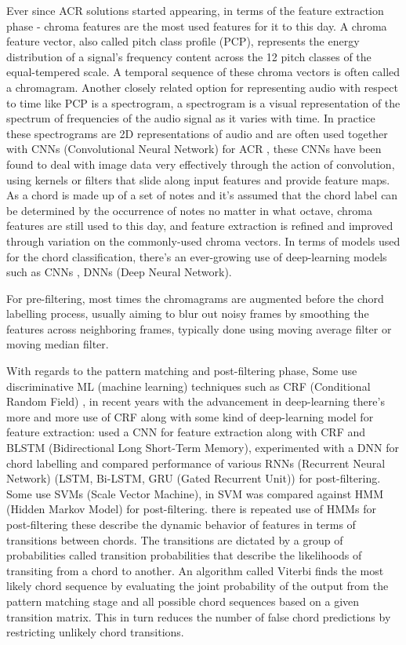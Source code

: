 \documentclass[a4paper]{article}
\begin{document}
Ever since ACR solutions started appearing, in terms of the feature extraction phase - chroma features are the most used features for it to this day.
A chroma feature vector, also called pitch class profile (PCP), represents the energy distribution of a signal’s frequency content across the 12 pitch classes of the equal-tempered scale.
A temporal sequence of these chroma vectors is often called a chromagram.
Another closely related option for representing audio with respect to time like PCP is a spectrogram, a spectrogram is a visual representation of the spectrum of frequencies of the audio signal as it varies with time. In practice these spectrograms are 2D representations of audio and are often used together with CNNs (Convolutional Neural Network) for ACR \cite{cnnacrspectro}, these CNNs have been found to deal with image data very effectively through the action of convolution, using kernels or filters that slide along input features and provide feature maps.
As a chord is made up of a set of notes and it's assumed that the chord label can be determined by the occurrence of notes no matter in what octave, chroma features are still used to this day, and feature extraction is refined and improved through variation on the commonly-used chroma vectors.
In terms of models used for the chord classification, there's an ever-growing use of deep-learning models such as CNNs , DNNs (Deep Neural Network).

For pre-filtering, most times the chromagrams are augmented before the chord labelling process, usually aiming to blur out noisy frames by smoothing the features across neighboring frames, typically done using moving average filter or moving median filter.

With regards to the pattern matching and post-filtering phase, Some use discriminative ML (machine learning) techniques such as CRF (Conditional Random Field) \cite{crf1}, in recent years with the advancement in deep-learning there's more and more use of CRF along with some kind of deep-learning model for feature extraction: 
\cite{crf2} used a CNN for feature extraction along with CRF and BLSTM (Bidirectional Long Short-Term Memory), \cite{crf3} experimented with a DNN for chord labelling and compared performance of various RNNs (Recurrent Neural Network) (LSTM, Bi-LSTM, GRU (Gated Recurrent Unit)) for post-filtering.
Some use SVMs (Scale Vector Machine), in \cite{svmVHMM} SVM was compared against HMM (Hidden Markov Model) for post-filtering.
there is repeated use of HMMs for post-filtering 
these describe the dynamic behavior of features in terms of transitions between chords. The transitions are dictated by a group of probabilities called transition probabilities that describe the likelihoods of transiting from a chord to another. An algorithm called Viterbi finds the most likely chord sequence by evaluating the joint probability of the output from the pattern matching stage and all possible chord sequences based on a given transition matrix. This in turn reduces the number of false chord predictions by restricting unlikely chord transitions.
\end{document}
